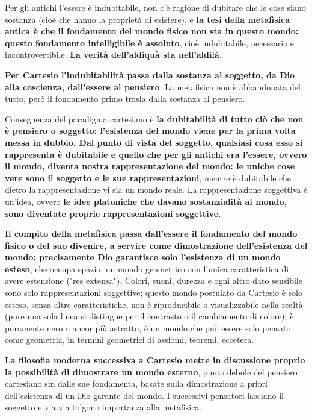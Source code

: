 Per gli antichi l'essere è indubitabile, non c'è ragione di dubitare che le cose siano sostanza (cioè che hanno la proprietà di esistere), e \textbf{la tesi della metafisica antica è che il fondamento del mondo fisico non sta in questo mondo: questo fondamento intelligibile è assoluto}, cioè indubitabile, necessario e incontrovertibile. \textbf{La verità dell'aldiquà sta nell'aldilà.}

\textbf{Per Cartesio l'indubitabilità passa dalla sostanza al soggetto, da Dio alla coscienza, dall'essere al pensiero}. La metafisica non è abbandonata del tutto, però il fondamento primo trasla dalla sostanza al pensiero.

Conseguenza del paradigma cartesiano è \textbf{la dubitabilità di tutto ciò che non è pensiero o soggetto: l'esistenza del mondo viene per la prima volta messa in dubbio. Dal punto di vista del soggetto, qualsiasi cosa esso si rappresenta è dubitabile e quello che per gli antichi era l'essere, ovvero il mondo, diventa nostra rappresentazione del mondo: le uniche cose vere sono il soggetto e le sue rappresentazioni}, mentre è dubitabile che dietro la rappresentazione vi sia un mondo reale. La rappresentazione soggettiva è un'idea, ovvero \textbf{le idee platoniche che davano sostanzialità al mondo, sono diventate proprie rappresentazioni soggettive.}

\textbf{Il compito della metafisica passa dall'essere il fondamento del mondo fisico o del suo divenire, a servire come dimostrazione dell'esistenza del mondo; precisamente Dio garantisce solo l'esistenza di un mondo esteso}, che occupa spazio, un mondo geometrico con l'unica caratteristica di avere estensione ("res extensa"). Colori, suoni, durezza e ogni altro dato sensibile sono solo rappresentazioni soggettive; questo mondo postulato da Cartesio è solo esteso, senza altre caratteristiche, non è riproducibile o visualizzabile nella realtà (pure una sola linea si distingue per il contrasto o il cambiamento di colore), è puramente nero o ancor più astratto, è un mondo che può essere solo pensato come geometria, in termini geometrici di assiomi, teoremi, eccetera.

\textbf{La filosofia moderna successiva a Cartesio mette in discussione proprio la possibilità di dimostrare un mondo esterno}, punto debole del pensiero cartesiano sin dalle sue fondamenta, basate sulla dimostrazione a priori dell'esistenza di un Dio garante del mondo. I successivi pensatori lasciano il soggetto e via via tolgono importanza alla metafisica.

